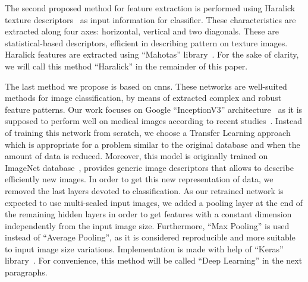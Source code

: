The second proposed method for feature extraction is performed using Haralick texture descriptors~\cite{Haralick1973} as input information for classifier. These characteristics are extracted along four axes: horizontal, vertical and two diagonals. These are statistical-based descriptors, efficient in describing pattern on texture images. Haralick features are extracted using “Mahotas” library~\cite{coelho2012mahotas}. For the sake of clarity, we will call this method “Haralick” in the remainder of this paper.\par
The last method we propose is based on \acsp{cnn}. These networks are well-suited methods for image classification, by means of extracted complex and robust feature patterns. Our work focuses on Google “InceptionV3” architecture~\cite{Szegedy2015} as it is supposed to perform well on medical images according to recent studies~\cite{Litjens2017}. Instead of training this network from scratch, we choose a Transfer Learning approach which is appropriate for a problem similar to the original database and when the amount of data is reduced. Moreover, this model is originally trained on ImageNet database~\cite{Deng2008}, provides generic image descriptors that allows to describe efficiently new images. In order to get this new representation of data, we removed the last layers devoted to classification. As our retrained network is expected to use multi-scaled input images, we added a pooling layer at the end of the remaining hidden layers in order to get features with a constant dimension independently from the input image size. Furthermore, “Max Pooling” is used instead of “Average Pooling”, as it is considered reproducible and more suitable to input image size variations. Implementation is made with help of “Keras” library~\cite{chollet2015keras}. For convenience, this method will be called “Deep Learning” in the next paragraphs.\par
